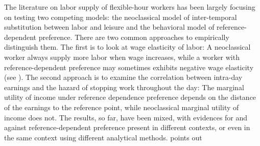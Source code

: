 \documentclass[reviewmode]{AEA}
\begin{document}
\maketitle



The literature on labor supply of flexible-hour workers has been  largely focusing on testing two competing models: the neoclassical model of inter-temporal substitution between labor and leisure and the behavioral model of reference-dependent preference. There are two common approaches to empirically distinguish them. The first is to look at wage elasticity of labor: A neoclassical worker always supply more labor when wage increases, while a worker with reference-dependent preference may sometimes exhibits negative wage elasticity (see \citet{camerer1997labor}). 
The second approach is to examine the correlation between intra-day earnings and the hazard of stopping work throughout the day: The marginal utility of income under reference dependence preference depends on the distance of the earnings to the reference point, while neoclassical marginal utility of income does not. 
The results, so far, have been mixed, with evidences for and against reference-dependent preference present in different contexts, or even in the same context using different analytical methods. \citet{thakral2018daily} points out 
\end{document}
